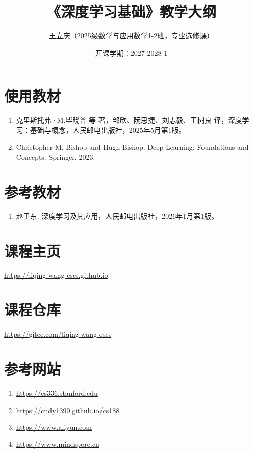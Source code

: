 \documentclass[10pt,a4paper]{article}
\author{王立庆（2025级数学与应用数学1-2班，专业选修课）}
\title{《深度学习基础》教学大纲}
\date{开课学期：2027-2028-1}
\begin{document}
\maketitle

\section*{使用教材}
\begin{enumerate}\itemsep0em 
\item 克里斯托弗·M.毕晓普 等 著，邹欣、阮思捷、刘志毅、王树良 译，深度学习：基础与概念，人民邮电出版社，2025年5月第1版。
\item Christopher M. Bishop and Hugh Bishop. Deep Learning: Foundations and Concepts. Springer. 2023. 
\end{enumerate}

\section*{参考教材}
\begin{enumerate}\itemsep0em 
\item 赵卫东. 深度学习及其应用，人民邮电出版社，2026年1月第1版。
\end{enumerate}

\section*{课程主页}
\url{https://liqing-wang-cscs.github.io}

\section*{课程仓库}
\url{https://gitee.com/liqing-wang-cscs}

\section*{参考网站}
\begin{enumerate}\itemsep0em 

\item  \url{https://cs336.stanford.edu}
\item  \url{https://cndy1390.github.io/cs188}
\item  \url{https://www.aliyun.com}
\item  \url{https://www.mindspore.cn}

\end{enumerate}
\end{document}
